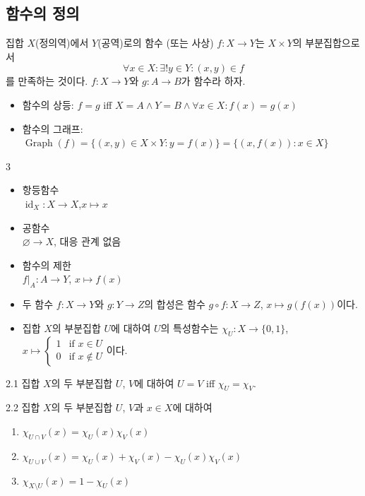 \documentclass{article}
\begin{document}
\subsection{함수의 정의}
집합 $X$(정의역)에서 $Y$(공역)로의 함수 (또는 사상) $f:X\to Y$는 $X\times Y$의 부분집합으로서
\[
    \forall x\in X:\exists!y\in Y:(x,y)\in f
\]
를 만족하는 것이다. $f:X\to Y$와 $g:A\to B$가 함수라 하자.
\begin{itemize}
    \item 함수의 상등: $f=g$ iff $X=A\wedge Y=B\wedge\forall x\in X:f(x)=g(x)$
    \item 함수의 그래프: $\operatorname{Graph}(f)=\{(x,y)\in X\times Y:y=f(x)\}=\{(x,f(x)):x\in X\}$
\end{itemize}

\begin{multicols}{3}
    \begin{itemize}
        \item 항등함수 \\
            $\operatorname{id}_X:X\to X$,$x\mapsto x$
        \item 공함수 \\
            $\varnothing\to X$, 대응 관계 없음
        \item 함수의 제한 \\
            $f|_A:A\to Y$, $x\mapsto f(x)$
    \end{itemize}
\end{multicols}

\begin{itemize}
    \item 두 함수 $f:X\to Y$와 $g:Y\to Z$의 합성은 함수 $g\circ f:X\to Z$, $x\mapsto g(f(x))$이다.
    \item 집합 $X$의 부분집합 $U$에 대하여 $U$의 특성함수는 $\chi_U:X\to\{0,1\}$, $x\mapsto\begin{cases}
        1 & \text{if } x\in U \\
        0 & \text{if } x\notin U
    \end{cases}$이다.
\end{itemize}

\begin{prop}{}{2.1}
    집합 $X$의 두 부분집합 $U$, $V$에 대하여 $U=V$ iff $\chi_U=\chi_V$.
\end{prop}

\begin{prop}{}{2.2}
    집합 $X$의 두 부분집합 $U$, $V$과 $x\in X$에 대하여
    \begin{enumerate}[(1)]
        \item $\chi_{U\cap V}(x)=\chi_U(x)\chi_V(x)$
        \item $\chi_{U\cup V}(x)=\chi_U(x)+\chi_V(x)-\chi_U(x)\chi_V(x)$
        \item $\chi_{X\setminus U}(x)=1-\chi_U(x)$
    \end{enumerate}
\end{prop}
\end{document}

